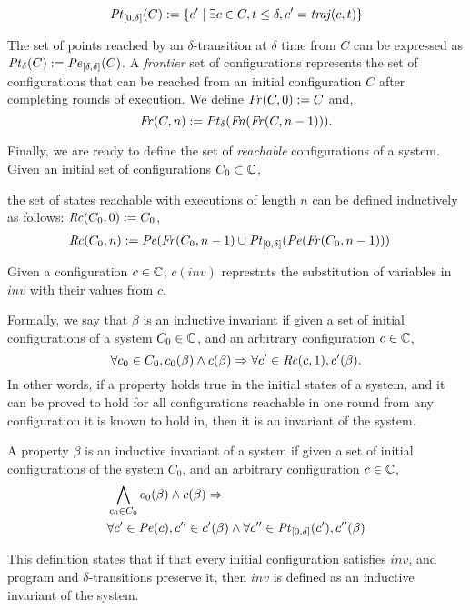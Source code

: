 $$\mathit{Pt}_{[0,\delta]}(C) := \left\{c^\prime \mid \exists c\in C, t\leq \delta , c^\prime = \mathit{traj}(c,t)\right\}$$

The set of points reached by an $\delta$-transition at $\delta$ time from $C$ can be expressed as $\mathit{Pt}_\delta(C) := \mathit{Pe}_{[\delta,\delta]}(C)$. A \emph{frontier} set of configurations represents the set of configurations that can be reached from an initial configuration $C$ after completing rounds of execution. We define $\mathit{Fr}(C,0) := C$ and,
$$\mathit{Fr}(C,n) := \mathit{Pt}_\delta(\mathit{Fn}(\mathit{Fr}(C,n-1))).$$

Finally, we are ready to define the set of \emph{reachable} configurations of a system. Given an initial set of configurations $C_0\subset\mathbb{C}$,

the set of states reachable with executions of length $n$ can be defined inductively as follows: $\mathit{Rc}(C_0,0) := C_0$,
\begin{align*}
\mathit{Rc}(C_0,n) &:= \mathit{Pe}(\mathit{Fr}(C_0,n-1) \cup \mathit{Pt}_{[0,\delta]}(\mathit{Pe}(\mathit{Fr}(C_0,n-1)))
\end{align*}

Given a configuration $c \in \mathbb{C}$, $c(\mathit{inv})$ represtnts the substitution of variables in $\mathit{inv}$ with their values from $c$.

 Formally, we say that $\beta$ is an inductive invariant if given a set of initial configurations of a system $C_0 \in \mathbb{C}$, and an arbitrary configuration $c \in \mathbb{C}$,  $$\forall c_0 \in C_0, c_0(\beta) \wedge c(\beta) \Rightarrow \forall c^\prime \in \mathit{Rc}(c,1), c^\prime(\beta).$$ In other words, if a property holds true in the initial states of a system, and it can be proved to hold for all configurations reachable in one round from any configuration it is known to hold in, then it is an invariant of the system.


\begin{definition}
\label{def:ii}
A property $\beta$ is an inductive invariant of a system if given a set of initial configurations of the system $C_0$, and an arbitrary configuration $c\in \mathbb{C}$,
\begin{align*}
&\bigwedge_{c_0\in C_0}c_0(\beta) \wedge c(\beta) \Rightarrow\\ & \forall c' \in \mathit{Pe}(c), c'' \in c'(\beta)\wedge \forall c'' \in \mathit{Pt}_{[0,\delta]}(c') , c''(\beta)
\end{align*}
\end{definition}


This definition states that if that every initial configuration satisfies $\mathit{inv}$, and  program and $\delta$-transitions preserve it, then $\mathit{inv}$ is defined as an inductive invariant of the system.


